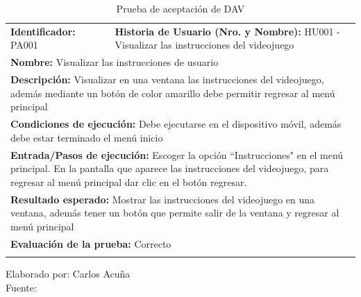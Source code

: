 \documentclass[a4paper, openright, 12pt]{report}
\begin{document}
\begin{itemize}
\begin{longtable}{| p{6cm} | p{6cm} |}
\captionsetup{justification=centering,margin=2cm}
\hline
\multicolumn{2}{|c|}{\textbf{Prueba de tarea}} \\
\hline
\textbf{Identificador:} PA001 & \textbf{Historia de Usuario (Nro. y Nombre):} HU001 - Visualizar las instrucciones del videojuego\\
\hline
\multicolumn{2}{|p{12cm}|}{\textbf{Nombre:} Visualizar las instrucciones de usuario} \\ \hline
\multicolumn{2}{|p{12cm}|}{\textbf{Descripción:} Visualizar en una ventana las instrucciones del videojuego, además mediante un botón de color amarillo debe permitir regresar al menú principal} \\ \hline
\multicolumn{2}{|p{12cm}|}{\textbf{Condiciones de ejecución:} Debe ejecutarse en el dispositivo móvil, además debe estar terminado el menú inicio} \\ \hline
\multicolumn{2}{|p{12cm}|}{\textbf{Entrada/Pasos de ejecución:}
Escoger la opción ``Instrucciones" en el menú principal.
En la pantalla que aparece las instrucciones del videojuego, para regresar al menú principal dar clic en el botón regresar.} \\ \hline
\multicolumn{2}{|p{12cm}|}{\textbf{Resultado esperado:} Mostrar las instrucciones del videojuego en una ventana, además tener un botón que permite salir de la ventana y regresar al menú principal} \\ \hline
\multicolumn{2}{|p{12cm}|}{\textbf{Evaluación de la prueba:} Correcto} \\ \hline
\caption{Prueba de aceptación de DAV}
\end{longtable}

\begin{center}
Elaborado por: Carlos Acuña\\Fuente: \cite{Implementacion2011}
\end{center}


\end{itemize}
\end{document}
